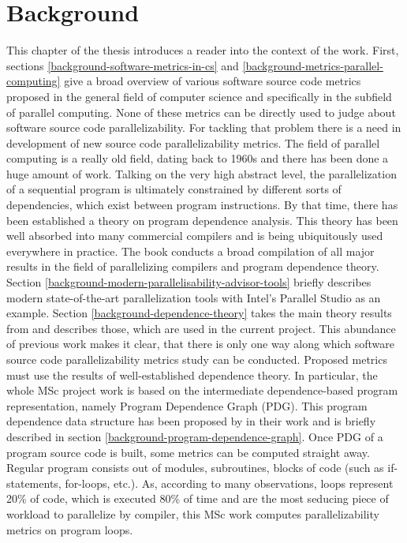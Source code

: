 \chapter{Background} \label{backgroud}
\qquad This chapter of the thesis introduces a reader into the context of the work. First, sections \ref{background-software-metrics-in-cs} and \ref{background-metrics-parallel-computing} give a broad overview of various software source code metrics proposed in the general field of computer science and specifically in the subfield of parallel computing. None of these metrics can be directly used to judge about software source code parallelizability. For tackling that problem there is a need in development of new source code parallelizability metrics.\newline
\null\qquad The field of parallel computing is a really old field, dating back to 1960s and there has been done a huge amount of work. Talking on the very high abstract level, the parallelization of a sequential program is ultimately constrained by different sorts of dependencies, which exist between program instructions. By that time, there has been established a theory on program dependence analysis. This theory has been well absorbed into many commercial compilers and is being ubiquitously used everywhere in practice. The book \cite{optimizing-compilers-book} conducts a broad compilation of all major results in the field of parallelizing compilers and program dependence theory. Section \ref{background-modern-parallelisability-advisor-tools} briefly describes modern state-of-the-art parallelization tools with Intel's Parallel Studio \cite{intel-parallel-studio} as an example. Section \ref{background-dependence-theory} takes the main theory results from \cite{optimizing-compilers-book} and describes those, which are used in the current project.\newline
\null\qquad This abundance of previous work makes it clear, that there is only one way along which software source code parallelizability metrics study can be conducted. Proposed metrics must use the results of well-established dependence theory. In particular, the whole MSc project work is based on the intermediate dependence-based program representation, namely Program Dependence Graph (PDG). This program dependence data structure has been proposed by in their work \cite{pdg-paper} and is briefly described in section \ref{background-program-dependence-graph}.\newline
\null\qquad Once PDG of a program source code is built, some metrics can be computed straight away. Regular program consists out of modules, subroutines, blocks of code (such as if-statements, for-loops, etc.). As, according to many observations, loops represent 20\% of code, which is executed 80\% of time and are the most seducing piece of workload to parallelize by compiler, this MSc work computes parallelizability metrics on program loops.\newline
